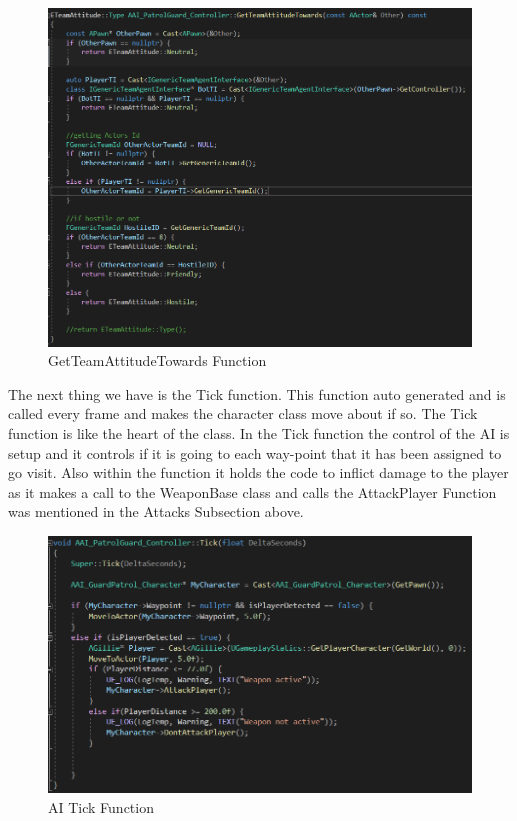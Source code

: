 \begin{figure}[H]
    \centering
    \includegraphics[scale=.4]{img/Team.PNG}
    \caption{GetTeamAttitudeTowards Function}
    \label{GetTeamAttitudeTowards}
\end{figure}
The next thing we have is the Tick function. This function auto generated and is called every frame and makes the character class move about if so. The Tick function is like the heart of the class. In the Tick function the control of the AI is setup and it controls if it is going to each way-point that it has been assigned to go visit. Also within the function it holds the code to inflict damage to the player as it makes a call to the WeaponBase class and calls the AttackPlayer Function was mentioned in the Attacks Subsection above.
\begin{figure}[H]
    \centering
    \includegraphics[scale=.4]{img/AITick.PNG}
    \caption{AI Tick Function}
    \label{Ai Tick}
\end{figure}
